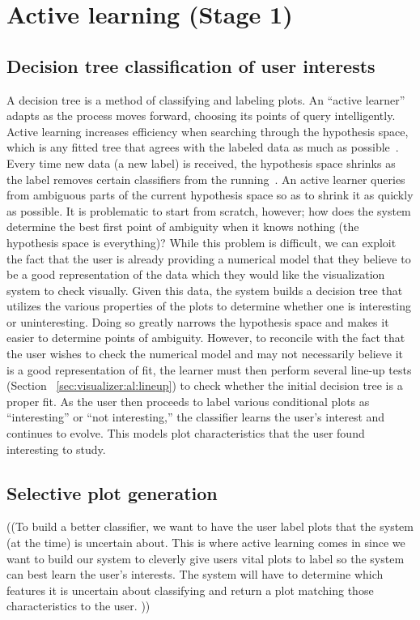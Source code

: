 \section{Active learning (Stage 1)}
\label{sec:visualizer:al}

\subsection{Decision tree classification of user interests}
\label{sec:visualizer:al:tree}

A decision tree is a method of classifying and labeling plots. An ``active learner'' adapts as the process moves forward, choosing its points of query intelligently. Active learning increases efficiency when searching through the hypothesis space, which is any fitted tree that agrees with the labeled data as much as possible~\cite{dasgupta2011}. Every time new data (a new label) is received, the hypothesis space shrinks as the label removes certain classifiers from the running~\cite{dasgupta2011}. An active learner queries from ambiguous parts of the current hypothesis space so as to shrink it as quickly as possible. It is problematic to start from scratch, however; how does the system determine the best first point of ambiguity when it knows nothing (the hypothesis space is everything)? While this problem is difficult, we can exploit the fact that the user is already providing a numerical model that they believe to be a good representation of the data which they would like the visualization system to check visually. Given this data, the system builds a decision tree that utilizes the various properties of the plots to determine whether one is interesting or uninteresting. Doing so greatly narrows the hypothesis space and makes it easier to determine points of ambiguity. However, to reconcile with the fact that the user wishes to check the numerical model and may not necessarily believe it is a good representation of fit, the learner must then perform several line-up tests (Section ~\ref{sec:visualizer:al:lineup}) to check whether the initial decision tree is a proper fit. As the user then proceeds to label various conditional plots as ``interesting'' or ``not interesting,'' the classifier learns the user’s interest and continues to evolve. This models plot characteristics that the user found interesting to study.

\subsection{Selective plot generation}
\label{sec:visualizer:al:alplotgeneration}

((To build a better classifier, we want to have the user label plots that the system (at the time) is uncertain about. This is where active learning comes in since we want to build our system to cleverly give users vital plots to label so the system can best learn the user’s interests. The system will have to determine which features it is uncertain about classifying and return a plot matching those characteristics to the user. ))